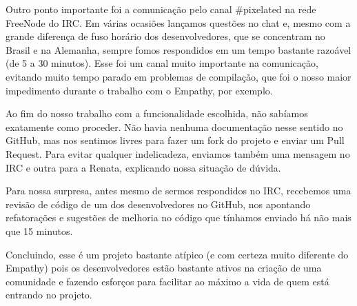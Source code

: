 Outro ponto importante foi a comunicação pelo canal \#pixelated na rede FreeNode
do IRC. Em várias ocasiões lançamos questões no chat e, mesmo com a grande
diferença de fuso horário dos desenvolvedores, que se concentram no Brasil e na
Alemanha, sempre fomos respondidos em um tempo bastante razoável
(de 5 a 30 minutos). Esse foi um canal muito importante na comunicação, evitando
muito tempo parado em problemas de compilação, que foi o nosso maior impedimento
durante o trabalho com o Empathy, por exemplo.

Ao fim do nosso trabalho com a funcionalidade escolhida, não sabíamos exatamente
como proceder. Não havia nenhuma documentação nesse sentido no GitHub, mas nos
sentimos livres para fazer um fork do projeto e enviar um Pull Request. Para
evitar qualquer indelicadeza, enviamos também uma mensagem no IRC e outra para a
Renata, explicando nossa situação de dúvida.

Para nossa surpresa, antes mesmo de sermos respondidos no IRC, recebemos uma
revisão de código de um dos desenvolvedores no GitHub, nos apontando
refatorações e sugestões de melhoria no código que tínhamos enviado há não mais
que 15 minutos.

Concluindo, esse é um projeto bastante atípico (e com certeza muito diferente
do Empathy) pois os desenvolvedores estão bastante ativos na criação de uma
comunidade e fazendo esforços para facilitar ao máximo a vida de quem está
entrando no projeto.
